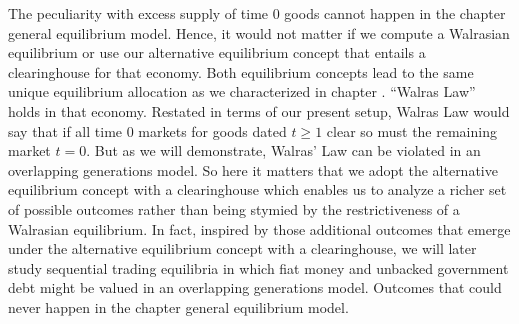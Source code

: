 The peculiarity with excess supply of time $0$
goods cannot happen in the chapter 
general equilibrium model. Hence, it would not matter
if we compute a Walrasian equilibrium or use our
alternative equilibrium concept that entails a
clearinghouse for that economy. Both equilibrium 
concepts lead to the same unique equilibrium allocation 
as we characterized in chapter .
``Walras Law'' holds in that economy. Restated in
terms of our present setup, Walras Law would
say that if all time $0$ markets for goods dated 
$t\geq 1$ clear so must the remaining market $t=0$.
But as we will demonstrate, Walras' Law can be 
violated in an overlapping generations model.
So here it matters that we adopt the alternative
equilibrium concept with a clearinghouse which
enables us to analyze a richer set of possible 
outcomes rather than being stymied by the 
restrictiveness of a Walrasian equilibrium. 
In fact, inspired by those additional 
outcomes that emerge under the alternative 
equilibrium concept with a clearinghouse,
we will later study sequential trading equilibria 
in which fiat money and unbacked government debt 
might be valued in an overlapping 
generations model. Outcomes that could never
happen in the chapter  general 
equilibrium model.







